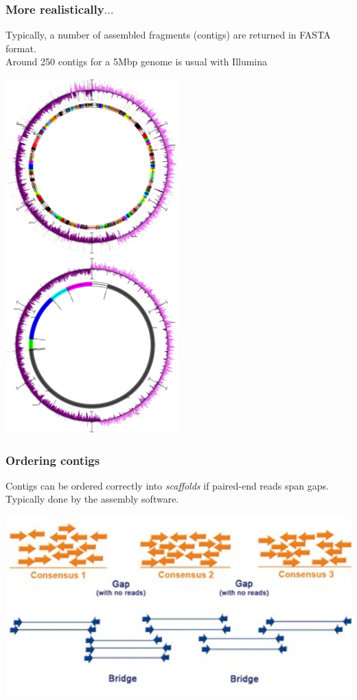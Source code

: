 \begin{frame}
  \frametitle{More realistically$\ldots$}
  Typically, a number of assembled fragments (contigs) are returned in FASTA format.\\
  Around 250 contigs for a 5Mbp genome is usual with Illumina\\
  \begin{center}
    \includegraphics[width=0.5\textwidth]{images/circle_1}
    \includegraphics[width=0.5\textwidth]{images/circle_3}
  \end{center}    
\end{frame}

\begin{frame}
  \frametitle{Ordering contigs}
  Contigs can be ordered correctly into \textit{scaffolds} if paired-end reads span gaps.\\
  Typically done by the assembly software.
  \begin{center}
    \includegraphics[width=1\textwidth]{images/contig_order_pe}
  \end{center}    
\end{frame}

